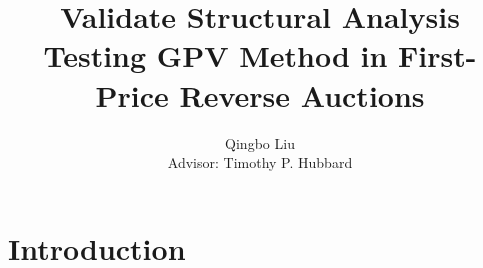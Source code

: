 \documentclass[11pt]{article}
\title{%
    Validate Structural Analysis \\ 
    \large Testing GPV Method in First-Price Reverse Auctions}
\author{Qingbo Liu\\[0.5cm]{\small Advisor: Timothy P. Hubbard}}
\begin{document}
\maketitle

\section{Introduction}


\end{document}
